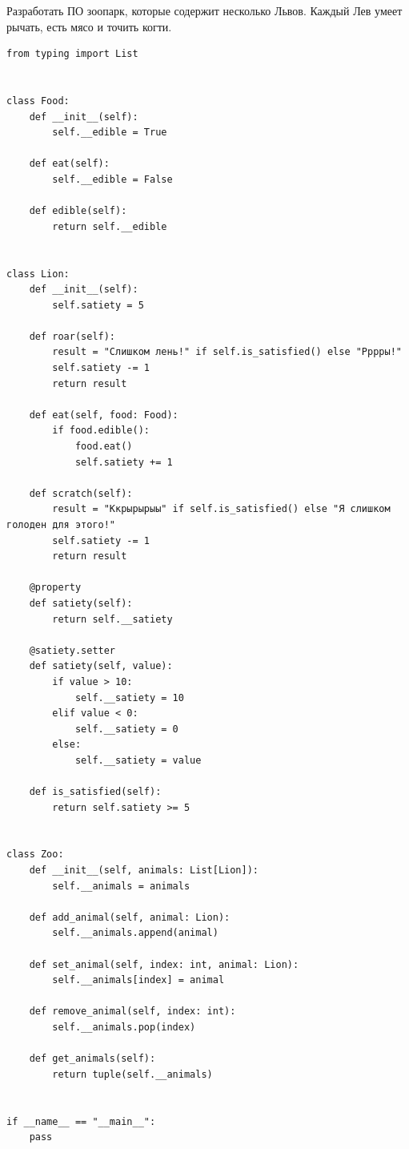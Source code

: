 \documentclass[a4paper,14pt]{extarticle}
\begin{document}
Разработать ПО зоопарк,
которые содержит несколько
Львов. Каждый Лев умеет
рычать, есть мясо и точить
когти.\\
\begin{verbatim}
from typing import List


class Food:
    def __init__(self):
        self.__edible = True

    def eat(self):
        self.__edible = False

    def edible(self):
        return self.__edible


class Lion:
    def __init__(self):
        self.satiety = 5

    def roar(self):
        result = "Слишком лень!" if self.is_satisfied() else "Рррры!"
        self.satiety -= 1
        return result

    def eat(self, food: Food):
        if food.edible():
            food.eat()
            self.satiety += 1

    def scratch(self):
        result = "Ккрырырыы" if self.is_satisfied() else "Я слишком голоден для этого!"
        self.satiety -= 1
        return result

    @property
    def satiety(self):
        return self.__satiety

    @satiety.setter
    def satiety(self, value):
        if value > 10:
            self.__satiety = 10
        elif value < 0:
            self.__satiety = 0
        else:
            self.__satiety = value

    def is_satisfied(self):
        return self.satiety >= 5


class Zoo:
    def __init__(self, animals: List[Lion]):
        self.__animals = animals

    def add_animal(self, animal: Lion):
        self.__animals.append(animal)

    def set_animal(self, index: int, animal: Lion):
        self.__animals[index] = animal

    def remove_animal(self, index: int):
        self.__animals.pop(index)

    def get_animals(self):
        return tuple(self.__animals)


if __name__ == "__main__":
    pass
\end{verbatim}
\end{document}
